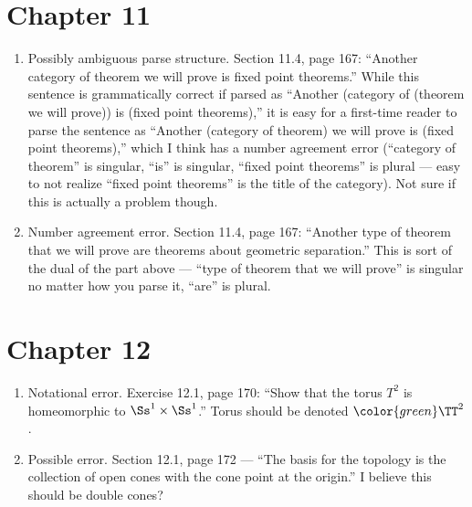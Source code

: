 \documentclass{fkletter}
\begin{document}
\section*{Chapter 11}
\begin{enumerate}
  \item Possibly ambiguous parse structure. Section 11.4, page 167: ``Another
    category of theorem we will prove is fixed point theorems.'' While this
    sentence is grammatically correct if parsed as ``Another (category of
    (theorem we will prove)) is (fixed point theorems),'' {\color{red}it is easy
      for a first-time reader to parse the sentence as ``Another (category of
      theorem) we will prove is (fixed point theorems),'' which I think has a
      number agreement error (``category of theorem'' is singular, ``is'' is
      singular, ``fixed point theorems'' is plural --- easy to not realize
      ``fixed point theorems'' is the title of the category).} Not sure if this
    is actually a problem though.
  \item Number agreement error. Section 11.4, page 167: ``Another type of
    theorem that we will prove {\color{red} are} theorems about geometric
    separation.'' This is sort of the dual of the part above --- ``type of
    theorem that we will prove'' is singular no matter how you parse it, ``are''
    is plural.
\end{enumerate}
\section*{Chapter 12}
\begin{enumerate}
  \item Notational error. Exercise 12.1, page 170: ``Show that the torus
    {\color{red}$T^2$} is homeomorphic to $\Ss^1 \times \Ss^1$.'' Torus should
    be denoted $\color{green}\TT^2$.
  \item Possible error. Section 12.1, page 172 --- ``The basis for the topology
    is the collection of {\color{red}open cones} with the cone point at the
    origin.'' I believe this should be double cones?
\end{enumerate}
\end{document}
